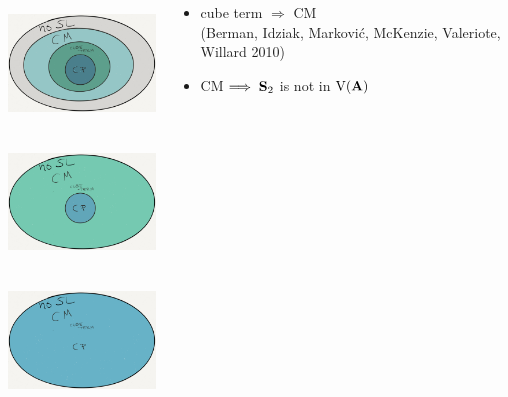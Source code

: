 \documentclass[xcolor=dvipsnames,9pt,hide notes,mathserif]{beamer}
\begin{document}
{  \begin{columns}
    \begin{column}{0.4\textwidth}
      \begin{overprint}
        \begin{center}\includegraphics[height=1.25in]{figures/NoSL-cropped.png}\end{center}
        \begin{center}\includegraphics[height=1.25in]{figures/CubeEquiv-cropped.png}\end{center}
        \begin{center}\includegraphics[height=1.25in]{figures/CPequiv-cropped.png}\end{center}
      \end{overprint}
      \vskip1cm
    \end{column}
    \begin{column}{0.6\textwidth}
      \begin{overprint}
        \begin{itemize}
        \item cube term $\Longrightarrow$ CM\\[4pt]
          (Berman, Idziak, Markovi{\'c}, McKenzie, Valeriote, Willard 2010)
          \\[10pt]
        \item CM $\Longrightarrow \; \mathbf{S}_2$ is not in $\operatorname{V}(\mathbf{A})$\\[4pt]

\end{itemize}
\end{overprint}
\end{column}
\end{columns}}
\end{document}

